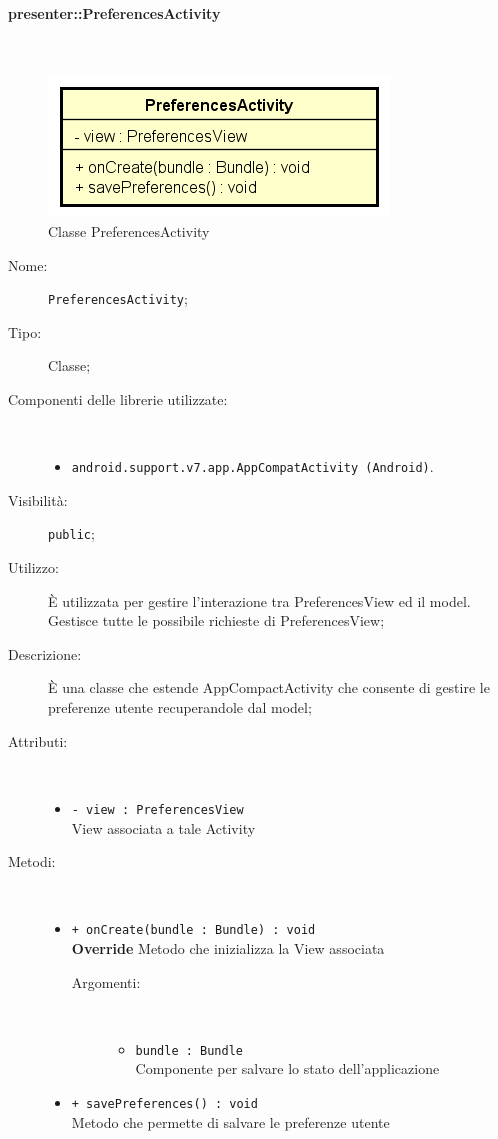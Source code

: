 \documentclass[../DefinizioneDiProdotto.tex]{subfiles}
\begin{document}
\paragraph{presenter::PreferencesActivity}
\
\begin{figure}[H]
	\centering
	\includegraphics[width=\maxwidth]{img/PreferencesActivity.png}
	\caption{Classe PreferencesActivity}\label{fig:presenter::PreferencesActivity} 
\end{figure}
\begin{description}
	\item[Nome:] \texttt{PreferencesActivity};
	\item[Tipo:] Classe;
	\item[Componenti delle librerie utilizzate:] \
	\begin{itemize}
		\item \texttt{android.support.v7.app.AppCompatActivity (Android)}.
		
	\end{itemize}
	\item[Visibilità:] \texttt{public};
	\item[Utilizzo:] È utilizzata per gestire l'interazione tra PreferencesView ed il model. Gestisce tutte le possibile richieste di PreferencesView;
	\item[Descrizione:] È una classe che estende AppCompactActivity che consente di gestire le preferenze utente recuperandole dal model;
	\item[Attributi:] \
	\begin{itemize}
		\item \texttt{- view : PreferencesView}\\
		View associata a tale Activity
		
	\end{itemize}
	\item[Metodi:] \
	\begin{itemize}
		\item \texttt{+ onCreate(bundle : Bundle) : void}\\
		\textbf{Override} Metodo che inizializza la View associata
		\begin{description}
			\item[Argomenti:] \
			\begin{itemize}
				\item \texttt{bundle : Bundle}\\
				Componente per salvare lo stato dell'applicazione\end{itemize}
		\end{description}
		\item \texttt{+ savePreferences() : void}\\
		Metodo che permette di salvare le preferenze utente
	\end{itemize}
\end{description}
\end{document}
